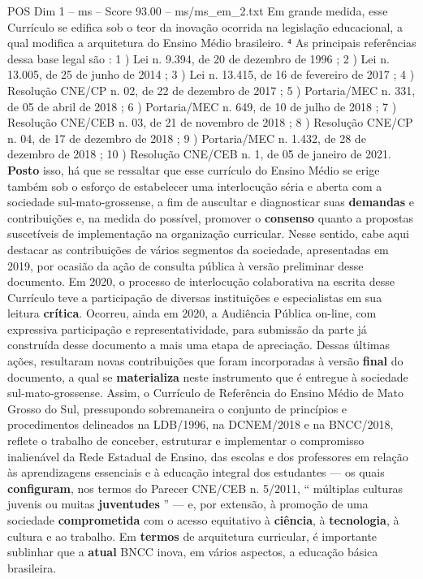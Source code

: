 \begin{textsample}{POS Dim 1 – ms – Score 93.00 – ms/ms\_em\_2.txt}
Em grande medida, esse Currículo se edifica sob o teor da inovação ocorrida na legislação educacional, a qual modifica a arquitetura do Ensino Médio brasileiro. ⁴ As principais referências dessa base legal são : 1 ) Lei n. 9.394, de 20 de dezembro de 1996 ; 2 ) Lei n. 13.005, de 25 de junho de 2014 ; 3 ) Lei n. 13.415, de 16 de fevereiro de 2017 ; 4 ) Resolução CNE/CP n. 02, de 22 de dezembro de 2017 ; 5 ) Portaria/MEC n. 331, de 05 de abril de 2018 ; 6 ) Portaria/MEC n. 649, de 10 de julho de 2018 ; 7 ) Resolução CNE/CEB n. 03, de 21 de novembro de 2018 ; 8 ) Resolução CNE/CP n. 04, de 17 de dezembro de 2018 ; 9 ) Portaria/MEC n. 1.432, de 28 de dezembro de 2018 ; 10 ) Resolução CNE/CEB n. 1, de 05 de janeiro de 2021. \textbf{Posto} isso, há que se ressaltar que esse currículo do Ensino Médio se erige também sob o esforço de estabelecer uma interlocução séria e aberta com a sociedade sul-mato-grossense, a fim de auscultar e diagnosticar suas \textbf{demandas} e contribuições e, na medida do possível, promover o \textbf{consenso} quanto a propostas suscetíveis de implementação na organização curricular.
Nesse sentido, cabe aqui destacar as contribuições de vários segmentos da sociedade, apresentadas em 2019, por ocasião da ação de consulta pública à versão preliminar desse documento.
Em 2020, o processo de interlocução colaborativa na escrita desse Currículo teve a participação de diversas instituições e especialistas em sua leitura \textbf{crítica}.
Ocorreu, ainda em 2020, a Audiência Pública on-line, com expressiva participação e representatividade, para submissão da parte já construída desse documento a mais uma etapa de apreciação.
Dessas últimas ações, resultaram novas contribuições que foram incorporadas à versão \textbf{final} do documento, a qual se \textbf{materializa} neste instrumento que é entregue à sociedade sul-mato-grossense.
Assim, o Currículo de Referência do Ensino Médio de Mato Grosso do Sul, pressupondo sobremaneira o conjunto de princípios e procedimentos delineados na LDB/1996, na DCNEM/2018 e na BNCC/2018, reflete o trabalho de conceber, estruturar e implementar o compromisso inalienável da Rede Estadual de Ensino, das escolas e dos professores em relação às aprendizagens essenciais e à educação integral dos estudantes — os quais \textbf{configuram}, nos termos do Parecer CNE/CEB n. 5/2011, “ múltiplas culturas juvenis ou muitas \textbf{juventudes} ” — e, por extensão, à promoção de uma sociedade \textbf{comprometida} com o acesso equitativo à \textbf{ciência}, à \textbf{tecnologia}, à cultura e ao trabalho.
Em \textbf{termos} de arquitetura curricular, é importante sublinhar que a \textbf{atual} BNCC inova, em vários aspectos, a educação básica brasileira.

\end{textsample}
